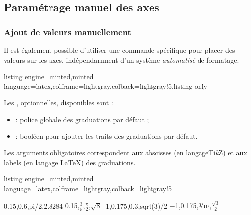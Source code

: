\documentclass[11pt,a4paper]{ltxdoc}
\providecommand\tikzlogo{Ti\textit{k}Z}
\let\TikZ\tikzlogo
\begin{document}
\pagebreak

\subsection{Paramétrage manuel des axes}

\subsubsection{Ajout de valeurs manuellement}\label{ajoutvals}

Il est également possible d'utiliser une commande spécifique pour placer des valeurs sur les axes, indépendamment d'un système \textit{automatisé} de formatage.

\begin{tcblisting}{listing engine=minted,minted language=latex,colframe=lightgray,colback=lightgray!5,listing only}
\end{tcblisting}

Les \MontreCode{[clés]}, optionnelles, disponibles sont :

\smallskip

\begin{itemize}
  \item {} : police globale des graduations { par défaut} ;
  \item {} : booléen pour ajouter les traits des graduations { par défaut}.
\end{itemize}

\smallskip

Les arguments obligatoires correspondent aux abscisses (en langage\TikZ) et aux labels (en langage \LaTeX) des graduations.

\begin{tcblisting}{listing engine=minted,minted language=latex,colframe=lightgray,colback=lightgray!5}
\begin{GraphiqueTikz}%
  [x=2.75cm,y=3cm,
  Xmin=0,Xmax=3.5,Xgrille=pi/12,Xgrilles=pi/24,
  Ymin=-1.05,Ymax=1.05,Ygrille=0.2,Ygrilles=0.05]
  \TracerAxesGrilles[Grad=false,Elargir=2.5mm,]{}{}
  \RajouterValeursAxeX
    {0.15,0.6,pi/2,2.8284}
    {\num{0.15},$\frac35$,$\displaystyle\frac{\pi}{2}$,$\sqrt{8}$}
  \RajouterValeursAxeY
    {-1,0.175,0.3,sqrt(3)/2}
    {\num{-1},\num{0.175},$\nicefrac{3}{10}$,$\frac{\sqrt{3}}{2}$}
\end{GraphiqueTikz}
\end{tcblisting}
\end{document}
